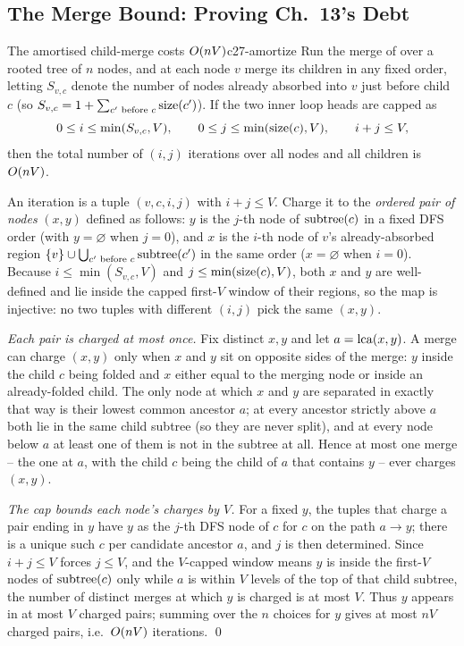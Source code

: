 \subsection{The Merge Bound: Proving Ch.~13's Debt}

\begin{theorem}{The amortised child-merge costs $O(nV)$}{c27-amortize}
Run the merge of  over a rooted tree of $n$ nodes, and
at each node $v$ merge its children in any fixed order, letting $S_{v,c}$
denote the number of nodes already absorbed into $v$ just before child $c$
(so $S_{v,c} = 1 + \sum_{c' \text{ before } c} \operatorname{size}(c')$). If the two inner
loop heads are capped as
\[
  0 \le i \le \min(S_{v,c}, V), \qquad 0 \le j \le \min(\operatorname{size}(c), V), \qquad i + j \le V,
\]
then the total number of $(i,j)$ iterations over all nodes and all children is
$O(nV)$.
\end{theorem}

\begin{proofbox}
An iteration is a tuple $(v, c, i, j)$ with $i + j \le V$. Charge it to the
\emph{ordered pair of nodes} $(x, y)$ defined as follows: $y$ is the $j$-th
node of $\operatorname{subtree}(c)$ in a fixed DFS order (with $y = \varnothing$ when $j = 0$),
and $x$ is the $i$-th node of $v$'s already-absorbed region
$\{v\} \cup \bigcup_{c' \text{ before } c} \operatorname{subtree}(c')$ in the same order
($x = \varnothing$ when $i = 0$). Because $i \le \min(S_{v,c}, V)$ and
$j \le \min(\operatorname{size}(c), V)$, both $x$ and $y$ are well-defined and lie inside
the capped first-$V$ window of their regions, so the map is injective: no two
tuples with different $(i,j)$ pick the same $(x,y)$.

\emph{Each pair is charged at most once.} Fix distinct $x, y$ and let
$a = \operatorname{lca}(x, y)$. A merge can charge $(x,y)$ only when $x$ and $y$ sit on
opposite sides of the merge: $y$ inside the child $c$ being folded and $x$
either equal to the merging node or inside an already-folded child. The only
node at which $x$ and $y$ are separated in exactly that way is their lowest
common ancestor $a$; at every ancestor strictly above $a$ both lie in the same
child subtree (so they are never split), and at every node below $a$ at least
one of them is not in the subtree at all. Hence at most one merge -- the one
at $a$, with the child $c$ being the child of $a$ that contains $y$ -- ever
charges $(x,y)$.

\emph{The cap bounds each node's charges by $V$.} For a fixed $y$, the tuples
that charge a pair ending in $y$ have $y$ as the $j$-th DFS node of $c$ for
$c$ on the path $a \to y$; there is a unique such $c$ per candidate ancestor
$a$, and $j$ is then determined. Since $i + j \le V$ forces $j \le V$, and the
$V$-capped window means $y$ is inside the first-$V$ nodes of $\operatorname{subtree}(c)$ only
while $a$ is within $V$ levels of the top of that child subtree, the number of
distinct merges at which $y$ is charged is at most $V$. Thus $y$ appears in at
most $V$ charged pairs; summing over the $n$ choices for $y$ gives at most
$nV$ charged pairs, i.e.\ $O(nV)$ iterations. \qed
\end{proofbox}

